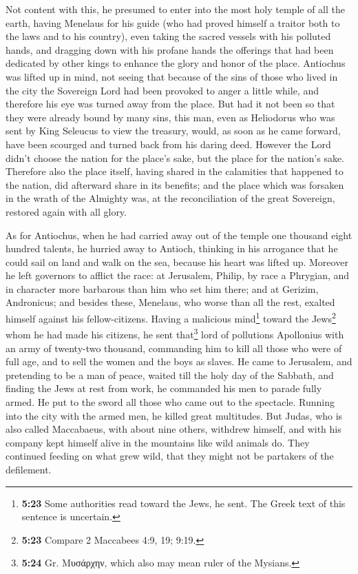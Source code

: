  Not content with this, he presumed to enter into the
most holy temple of all the earth, having Menelaus for his guide (who
had proved himself a traitor both to the laws and to his country),
 even taking the sacred vessels with his polluted hands,
and dragging down with his profane hands the offerings that had been
dedicated by other kings to enhance the glory and honor of the place.
 Antiochus was lifted up in mind, not seeing that because
of the sins of those who lived in the city the Sovereign Lord had been
provoked to anger a little while, and therefore his eye was turned away
from the place.  But had it not been so that they were
already bound by many sins, this man, even as Heliodorus who was sent by
King Seleucus to view the treasury, would, as soon as he came forward,
have been scourged and turned back from his daring deed. 
However the Lord didn't choose the nation for the place's sake, but the
place for the nation's sake.  Therefore also the place
itself, having shared in the calamities that happened to the nation, did
afterward share in its benefits; and the place which was forsaken in the
wrath of the Almighty was, at the reconciliation of the great Sovereign,
restored again with all glory.

 As for Antiochus, when he had carried away out of the
temple one thousand eight hundred talents, he hurried away to Antioch,
thinking in his arrogance that he could sail on land and walk on the
sea, because his heart was lifted up.  Moreover he left
governors to afflict the race: at Jerusalem, Philip, by race a Phrygian,
and in character more barbarous than him who set him there;
 and at Gerizim, Andronicus; and besides these, Menelaus,
who worse than all the rest, exalted himself against his
fellow-citizens. Having a malicious mind\footnote{\textbf{5:23} Some
  authorities read toward the Jews, he sent. The Greek text of this
  sentence is uncertain.} toward the Jews\footnote{\textbf{5:23} Compare
  2 Maccabees 4:9, 19; 9:19.} whom he had made his citizens,
 he sent that\footnote{\textbf{5:24} Gr. Μυσάρχην, which
  also may mean ruler of the Mysians.} lord of pollutions Apollonius
with an army of twenty-two thousand, commanding him to kill all those
who were of full age, and to sell the women and the boys as slaves.
 He came to Jerusalem, and pretending to be a man of
peace, waited till the holy day of the Sabbath, and finding the Jews at
rest from work, he commanded his men to parade fully armed.
 He put to the sword all those who came out to the
spectacle. Running into the city with the armed men, he killed great
multitudes.  But Judas, who is also called Maccabaeus,
with about nine others, withdrew himself, and with his company kept
himself alive in the mountains like wild animals do. They continued
feeding on what grew wild, that they might not be partakers of the
defilement.


